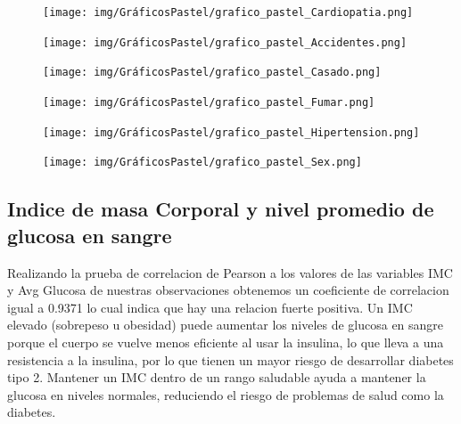 \documentclass[a4paper, 12pt]{article}
\begin{document}
\begin{figure}[H]
    \centering
    \begin{minipage}{0.45\textwidth}
        \centering
        \texttt{[image: img/GráficosPastel/grafico\_pastel\_Cardiopatia.png]}
    \end{minipage}
    \begin{minipage}{0.45\textwidth}
        \centering
        \texttt{[image: img/GráficosPastel/grafico\_pastel\_Accidentes.png]}
    \end{minipage}
    \vfill
    \begin{minipage}{0.45\textwidth}
        \centering
        \texttt{[image: img/GráficosPastel/grafico\_pastel\_Casado.png]}
    \end{minipage}
    \begin{minipage}{0.45\textwidth}
        \centering
        \texttt{[image: img/GráficosPastel/grafico\_pastel\_Fumar.png]}
    \end{minipage}
    \vfill
    \begin{minipage}{0.45\textwidth}
        \centering
        \texttt{[image: img/GráficosPastel/grafico\_pastel\_Hipertension.png]}
    \end{minipage}
    \begin{minipage}{0.45\textwidth}
        \centering
        \texttt{[image: img/GráficosPastel/grafico\_pastel\_Sex.png]}
    \end{minipage}
    \vfill
\end{figure}

\newpage


\subsection{Indice de masa Corporal y nivel promedio de glucosa en sangre}
Realizando la prueba de correlacion de Pearson a los valores de las variables IMC y Avg Glucosa de nuestras observaciones obtenemos un coeficiente de correlacion igual a 0.9371 lo cual indica que hay una relacion fuerte positiva.
Un IMC elevado (sobrepeso u obesidad) puede aumentar los niveles de glucosa en sangre porque el cuerpo se vuelve menos eficiente al usar la insulina, 
lo que lleva a una resistencia a la insulina, por lo que tienen un mayor riesgo de desarrollar diabetes tipo 2.
Mantener un IMC dentro de un rango saludable ayuda a mantener la glucosa en niveles normales, reduciendo el riesgo de problemas de salud como la diabetes.
\end{document}
